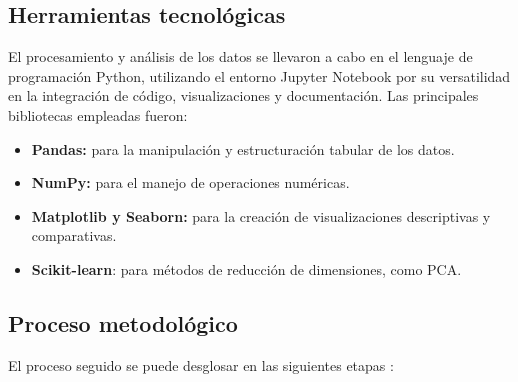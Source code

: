 \documentclass{article}
\begin{document}
\subsection{Herramientas tecnológicas}

El procesamiento y análisis de los datos se llevaron a cabo en el lenguaje de programación Python, utilizando el entorno Jupyter Notebook por su versatilidad en la integración de código, visualizaciones y documentación. Las principales bibliotecas empleadas fueron:

\begin{itemize}
	\item \textbf{Pandas:} para la manipulación y estructuración tabular de los datos.
	\item \textbf{NumPy:} para el manejo de operaciones numéricas.	
	\item \textbf{Matplotlib y Seaborn:} para la creación de visualizaciones descriptivas y comparativas.		
	\item \textbf{Scikit-learn}: para métodos de reducción de dimensiones, como PCA.
\end{itemize}

\subsection{Proceso metodológico}

El proceso seguido se puede desglosar en las siguientes etapas \cite{Gacia}:
\end{document}
